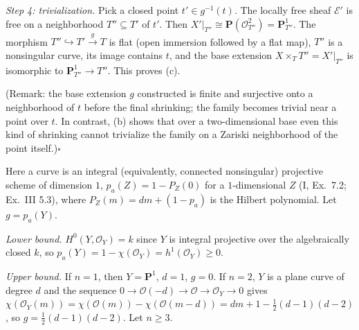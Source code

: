 \documentclass[11pt]{article}
\begin{document}
\emph{Step 4: trivialization.} Pick a closed point $t'\in g^{-1}(t)$. The locally free sheaf $\mathcal E'$ is free on a neighborhood $T''\subseteq T'$ of $t'$. Then $X'|_{T''}\cong\mathbf P(\mathcal O_{T''}^{2})=\mathbf P^1_{T''}$. The morphism $T''\hookrightarrow T'\xrightarrow{g}T$ is flat (open immersion followed by a flat map), $T''$ is a nonsingular curve, its image contains $t$, and the base extension $X\times_TT''=X'|_{T''}$ is isomorphic to $\mathbf P^1_{T''}\to T''$. This proves (c).

(Remark: the base extension $g$ constructed is finite and surjective onto a neighborhood of $t$ before the final shrinking; the family becomes trivial near a point over $t$. In contrast, (b) shows that over a two-dimensional base even this kind of shrinking cannot trivialize the family on a Zariski neighborhood of the point itself.)\hfill$\square$

\pf
Here a curve is an integral (equivalently, connected nonsingular) projective scheme of dimension $1$, $p_a(Z)=1-P_Z(0)$ for a $1$-dimensional $Z$ (I, Ex.~7.2; Ex.~III 5.3), where $P_Z(m)=dm+(1-p_a)$ is the Hilbert polynomial. Let $g=p_a(Y)$.

\emph{Lower bound.} $H^0(Y,\mathcal O_Y)=k$ since $Y$ is integral projective over the algebraically closed $k$, so $p_a(Y)=1-\chi(\mathcal O_Y)=h^1(\mathcal O_Y)\ge0$.

\emph{Upper bound.} If $n=1$, then $Y=\mathbf P^1$, $d=1$, $g=0$. If $n=2$, $Y$ is a plane curve of degree $d$ and the sequence $0\to\mathcal O(-d)\to\mathcal O\to\mathcal O_Y\to0$ gives $\chi(\mathcal O_Y(m))=\chi(\mathcal O(m))-\chi(\mathcal O(m-d))=dm+1-\tfrac12(d-1)(d-2)$, so $g=\frac12(d-1)(d-2)$. Let $n\ge3$.
\end{document}
